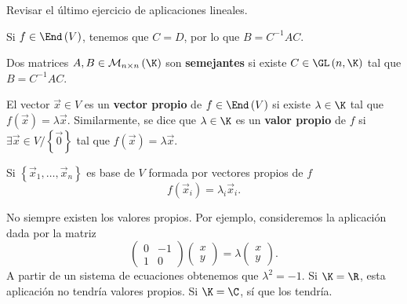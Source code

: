 \begin{observation}
\normalfont Revisar el último ejercicio de aplicaciones lineales.
\end{observation}

\begin{observation}
\normalfont Si $\displaystyle f \in \End\left(V\right) $, tenemos que $\displaystyle C = D $, por lo que $\displaystyle B = C^{-1}AC $.
\end{observation}

\begin{fdefinition}[]
\normalfont Dos matrices $\displaystyle A, B \in \mathcal{M}_{n \times n}\left(\K\right) $ son \textbf{semejantes} si existe $\displaystyle C \in \GL\left(n, \K\right) $ tal que $\displaystyle B = C^{-1}AC $.
\end{fdefinition}

\begin{fdefinition}[]
	\normalfont El vector $\displaystyle \vec{x} \in V $ es un \textbf{vector propio} de $\displaystyle f \in \End\left(V\right) $ si existe $\displaystyle \lambda \in \K $ tal que $\displaystyle f\left(\vec{x}\right) = \lambda \vec{x} $. Similarmente, se dice que $\displaystyle \lambda \in \K $ es un \textbf{valor propio} de $\displaystyle f $ si $\displaystyle \exists \vec{x} \in V/ \left\{ \vec{0}\right\}  $ tal que $\displaystyle f\left(\vec{x}\right) = \lambda \vec{x} $.
\end{fdefinition}

Si $\displaystyle \left\{ \vec{x}_{1}, \ldots, \vec{x}_{n}\right\}  $ es base de $\displaystyle V $ formada por vectores propios de $\displaystyle f $
\[f\left(\vec{x}_{i}\right) = \lambda_{i}\vec{x}_{i} .\]

\begin{eg}
\normalfont No siempre existen los valores propios. Por ejemplo, consideremos la aplicación dada por la matriz
\[\begin{pmatrix} 0 & -1 \\ 1 & 0 \end{pmatrix}\begin{pmatrix} x \\ y \end{pmatrix}  = \lambda\begin{pmatrix} x \\ y \end{pmatrix}.\]
A partir de un sistema de ecuaciones obtenemos que $\displaystyle \lambda^{2} = -1 $. Si $\displaystyle \K = \R $, esta aplicación no tendría valores propios. Si $\displaystyle \K = \C $, sí que los tendría.
\end{eg}

